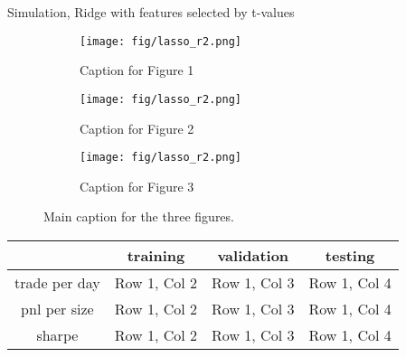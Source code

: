 \documentclass[10pt]{beamer}
\begin{document}
\begin{frame}{Simulation, Ridge with features selected by t-values}


\begin{figure}[h!]
    \centering
    \begin{subfigure}[b]{0.3\textwidth}
        \centering
        \texttt{[image: fig/lasso\_r2.png]}
        \caption{Caption for Figure 1}
        \label{fig:figure1}
    \end{subfigure}
    \hfill
    \begin{subfigure}[b]{0.3\textwidth}
        \centering
        \texttt{[image: fig/lasso\_r2.png]}
        \caption{Caption for Figure 2}
        \label{fig:figure2}
    \end{subfigure}
    \hfill
    \begin{subfigure}[b]{0.3\textwidth}
        \centering
        \texttt{[image: fig/lasso\_r2.png]}
        \caption{Caption for Figure 3}
        \label{fig:figure3}
    \end{subfigure}
    \caption{Main caption for the three figures.}
    \label{fig:three_figures}
\end{figure}


\begin{table}[h!]
\centering
\begin{tabular}{c|c|c|c}
\hline
 & \textbf{training} & \textbf{validation} & \textbf{testing} \\ \hline
trade per day      & Row 1, Col 2      & Row 1, Col 3      & Row 1, Col 4      \\ \hline
pnl per size      & Row 1, Col 2      & Row 1, Col 3      & Row 1, Col 4      \\ \hline
sharpe      & Row 1, Col 2      & Row 1, Col 3      & Row 1, Col 4      \\ \hline
\end{tabular}
\end{table}


\end{frame}
\end{document}
